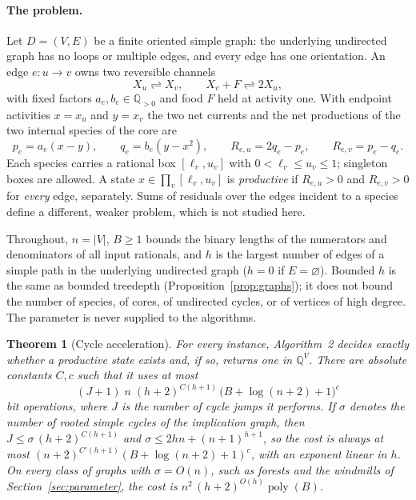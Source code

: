\documentclass[11pt,a4paper]{article}
\theoremstyle{plain}
\newtheorem{theorem}{Theorem}[section]
\theoremstyle{definition}
\theoremstyle{remark}
\newcommand{\Q}{\mathbb{Q}}
\newcommand{\rev}{\rightleftharpoons}
\newcommand{\poly}{\operatorname{poly}}
\begin{document}
\paragraph{The problem.} Let $D=(V,E)$ be a finite oriented simple graph: the underlying undirected graph has no loops or multiple edges, and every edge has one orientation. An edge $e\colon u\to v$ owns two reversible channels
\begin{equation}\label{eq:chemistry}
  X_u\rev X_v,\qquad X_v+F\rev 2X_u ,
\end{equation}
with fixed factors $a_e,b_e\in\Q_{>0}$ and food $F$ held at activity one. With endpoint activities $x=x_u$ and $y=x_v$ the two net currents and the net productions of the two internal species of the core are
\begin{equation}\label{eq:rates}
  p_e=a_e(x-y),\qquad q_e=b_e(y-x^2),\qquad R_{e,u}=2q_e-p_e,\qquad R_{e,v}=p_e-q_e .
\end{equation}
Each species carries a rational box $[\ell_v,u_v]$ with $0<\ell_v\le u_v\le1$; singleton boxes are allowed. A state $x\in\prod_v[\ell_v,u_v]$ is \emph{productive} if $R_{e,u}>0$ and $R_{e,v}>0$ for \emph{every} edge, separately. Sums of residuals over the edges incident to a species define a different, weaker problem, which is not studied here.

Throughout, $n=|V|$, $B\ge1$ bounds the binary lengths of the numerators and denominators of all input rationals, and $h$ is the largest number of edges of a simple path in the underlying undirected graph ($h=0$ if $E=\varnothing$). Bounded $h$ is the same as bounded treedepth (Proposition~\ref{prop:graphs}); it does not bound the number of species, of cores, of undirected cycles, or of vertices of high degree. The parameter is never supplied to the algorithms.

\begin{theorem}[Cycle acceleration]\label{thm:main}
For every instance, Algorithm~2 decides exactly whether a productive state exists and, if so, returns one in $\Q^V$. There are absolute constants $C,c$ such that it uses at most
\begin{equation}\label{eq:mainbound}
 (J+1)\;n\;(h+2)^{C(h+1)}\,\bigl(B+\log(n+2)+1\bigr)^{c}
\end{equation}
bit operations, where $J$ is the number of cycle jumps it performs. If $\sigma$ denotes the number of rooted simple cycles of the implication graph, then $J\le\sigma\,(h+2)^{C(h+1)}$ and $\sigma\le 2hn+(n+1)^{h+1}$, so the cost is always at most $(n+2)^{C'(h+1)}(B+\log(n+2)+1)^{c}$, with an exponent linear in $h$. On every class of graphs with $\sigma=O(n)$, such as forests and the windmills of Section~\ref{sec:parameter}, the cost is $n^2\,(h+2)^{O(h)}\poly(B)$.
\end{theorem}
\end{document}
